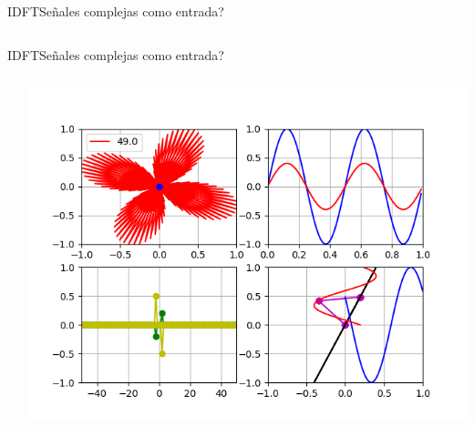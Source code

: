 \begin{frame}{IDFT}{Señales complejas como entrada?}
   \handsonicon
   \begin{columns}[c]
      \hspace{2pt}
      \begin{column}{.5\textwidth}
         
      \end{column}
      \hspace{2pt}
      \vrule
      \hspace{2pt}
      \begin{column}{.5\textwidth}
         
      \end{column}
   \end{columns}
   \vfill
\end{frame}
\begin{frame}{IDFT}{Señales complejas como entrada?}
   \handsonicon
   \begin{columns}[c]
      \hspace{2pt}
      \begin{column}{.5\textwidth}
         
      \end{column}
      \hspace{2pt}
      \vrule
      \hspace{2pt}
      \begin{column}{.4\textwidth}
         \centering\includegraphics[width=1.0\textwidth]{3_clase/euler7}
      \end{column}
      \hspace{2pt}
   \end{columns}
   \vfill
\end{frame}
